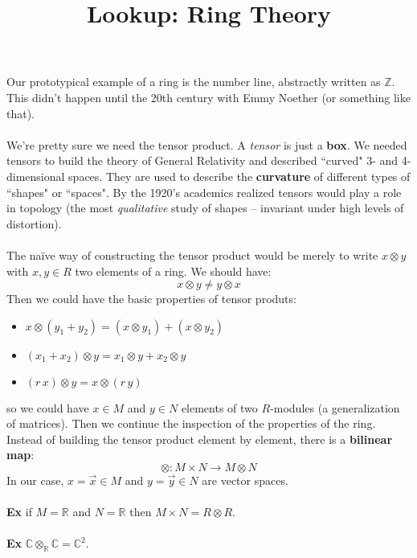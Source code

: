 \documentclass[12pt]{article}
\title{Lookup: Ring Theory}
\date{}
\begin{document}
\sffamily

\maketitle

{\fontsize{16pt}{16pt}\selectfont 
 
\noindent Our prototypical example of a ring is the number line, abstractly written as $\mathbb{Z}$.  This didn't happen until the 20th century with Emmy Noether (or something like that). \\ \\
\noindent We're pretty sure we need the tensor product.  A \textit{tensor} is just a \textbf{box}.  We needed tensors to build the theory of General Relativity and described ``curved" 3- and 4-dimensional spaces.  They are used to describe the \textbf{curvature} of different types of ``shapes" or ``spaces".  By the 1920's academics realized tensors would play a role in topology (the most \textit{qualitative} study of shapes -- invariant under high levels of distortion).  \\ \\
The na\"{i}ve way of constructing the tensor product would be merely to write $x \otimes y$ with $x, y \in R$ two elements of a ring.  We should have:
$$ x \otimes y \neq y \otimes x $$
Then we could have the basic properties of tensor produts:
\begin{itemize}
\item $x \otimes (y_1 + y_2) = (x \otimes y_1) + (x \otimes y_2)$
\item $(x_1 + x_2) \otimes y = x_1 \otimes y + x_2 \otimes  y$
\item $(r\, x ) \otimes y = x \otimes (r \, y)$
\end{itemize}
so we could have $x \in M$ and $y \in N$ elements of two $R$-modules (a generalization of matrices).  Then we continue the inspection of the properties of the ring.  Instead of building the tensor product element by element, there is a \textbf{bilinear map}:
$$ \otimes : M \times N \to M \otimes N $$
In our case, $x = \vec{x} \in M$ and $ y = \vec{y} \in N$ are vector spaces. \\ \\  
\textbf{Ex} if $M = \mathbb{R}$ and $N = \mathbb{R}$ then $M \times N = R \otimes R$. \\ \\
\textbf{Ex} $\mathbb{C} \otimes_{\mathbb{R}} \mathbb{C} = \mathbb{C}^2$. \\ \\
}
\end{document}
